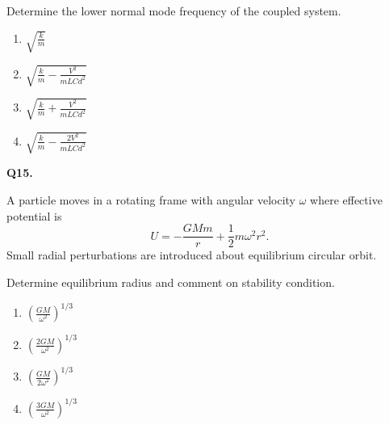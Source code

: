 \documentclass[12pt]{article}
\begin{document}
Determine the lower normal mode frequency of the coupled system.

\begin{center}
\end{center}

\begin{enumerate}
\item[(A)] $\sqrt{\frac{k}{m}}$
\item[(B)] $\sqrt{\frac{k}{m}-\frac{V^2}{mLCd^2}}$
\item[(C)] $\sqrt{\frac{k}{m}+\frac{V^2}{mLCd^2}}$
\item[(D)] $\sqrt{\frac{k}{m}-\frac{2V^2}{mLCd^2}}$
\end{enumerate}


\textbf{Q15.}

A particle moves in a rotating frame with angular velocity $\omega$ where effective potential is  
\[
U=-\frac{GMm}{r}+\frac12 m\omega^2 r^2.
\]
Small radial perturbations are introduced about equilibrium circular orbit.

Determine equilibrium radius and comment on stability condition.

\begin{enumerate}
\item[(A)] $\left(\frac{GM}{\omega^2}\right)^{1/3}$
\item[(B)] $\left(\frac{2GM}{\omega^2}\right)^{1/3}$
\item[(C)] $\left(\frac{GM}{2\omega^2}\right)^{1/3}$
\item[(D)] $\left(\frac{3GM}{\omega^2}\right)^{1/3}$
\end{enumerate}

\end{document}

